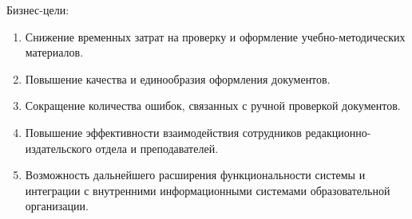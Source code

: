 Бизнес-цели:
\begin{enumerate}
	\item Снижение временных затрат на проверку и оформление учебно-методических материалов.
	
	\item Повышение качества и единообразия оформления документов.
	
	\item Сокращение количества ошибок, связанных с ручной проверкой документов.
	
	\item Повышение эффективности взаимодействия сотрудников редакционно-издательского отдела и преподавателей.
	
	\item Возможность дальнейшего расширения функциональности системы и интеграции с внутренними информационными системами образовательной организации.
\end{enumerate}